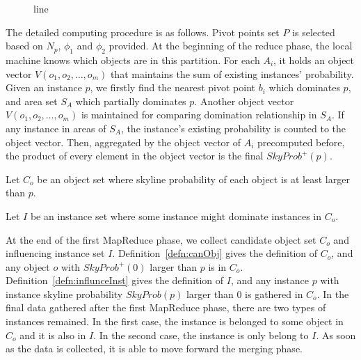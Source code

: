 \begin{figure}[!b]
\vspace{-15pt}
\centering
  \centerline{}
  \caption{line}
  \vspace{-15pt}
  \label{figure:midLine}
\end{figure}

The detailed computing procedure is as follows. Pivot points set $P$ is selected based on $N_p$, $\phi_1$ and $\phi_2$ provided. At the beginning of the reduce phase, the local machine knows which objects are in this partition. For each $A_i$, it holds an object vector $V(o_1, o_2, \dots, o_m)$ that maintains the sum of existing instances' probability. Given an instance $p$, we firstly find the nearest pivot point $b_i$ which dominates $p$, and area set $S_A$ which partially dominates $p$. Another object vector $V(o_1, o_2, \dots, o_m)$ is maintained for comparing domination relationship in $S_A$. If any instance in areas of $S_A$, the instance's existing probability is counted to the object vector. Then, aggregated by the object vector of $A_i$ precomputed before, the product of every element in the object vector is the final $SkyProb^+(p)$.

\begin{defn}
\label{defn:canObj}
Let $C_o$ be an object set where skyline probability of each object is at least larger than $p$.
\end{defn}

\begin{defn}
\label{defn:influnceInst}
Let $I$ be an instance set where some instance might dominate instances in $C_o$.
\end{defn}

At the end of the first MapReduce phase, we collect candidate object set $C_o$ and influencing instance set $I$. Definition~\ref{defn:canObj} gives the definition of $C_o$, and any object $o$ with $SkyProb^+(0)$ larger than $p$ is in $C_o$. Definition~\ref{defn:influnceInst} gives the definition of $I$, and any instance $p$ with instance skyline probability $SkyProb(p)$ larger than $0$ is gathered in $C_o$. In the final data gathered after the first MapReduce phase, there are two types of instances remained. In the first case, the instance is belonged to some object in $C_o$ and it is also in $I$. In the second case, the instance is only belong to $I$. As soon as the data is collected, it is able to move forward the merging phase.


